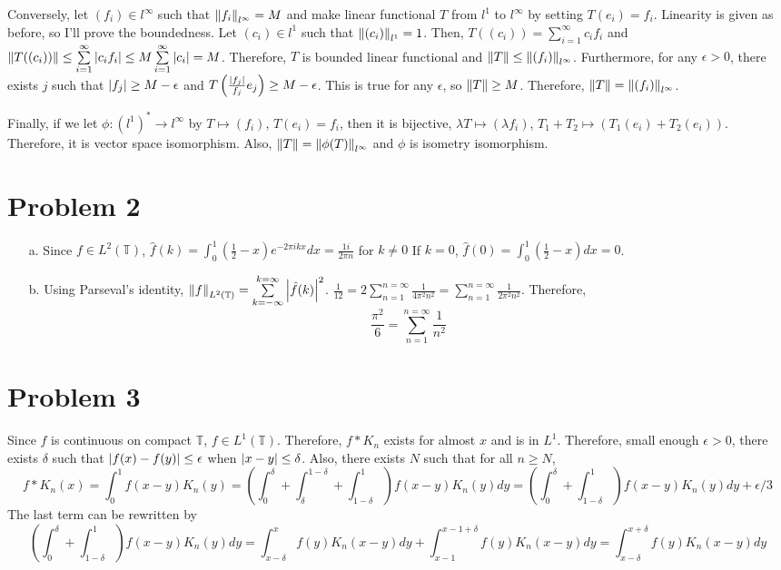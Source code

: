 \documentclass{article}
\begin{document}
Conversely, let $(f_i)\in l^\infty$ such that $\norm{f_i}_{l^\infty}=M$ and make linear functional $T$ from $l^1$ to $l^\infty$ by setting $T(e_i)=f_i$. Linearity is given as before, so I'll prove the boundedness. Let $(c_i)\in l^1$ such that $\norm{(c_i)}_{l^1}=1$. Then, $T((c_i))=\sum\limits_{i=1}^\infty c_i f_i$ and $\norm{T((c_i))}\leq \sum\limits_{i=1}^\infty \abs{c_i f_i}\leq M \sum\limits_{i=1}^\infty \abs{c_i}=M$. Therefore, $T$ is bounded linear functional and $\norm{T}\leq \norm{(f_i)}_{l^\infty}$. Furthermore, for any $\epsilon>0$, there exists $j$ such that $\abs{f_j}\geq M-\epsilon$ and $T\left(\frac{\abs{f_j}}{f_j}e_j\right)\geq M-\epsilon$. This is true for any $\epsilon$, so $\norm{T}\geq M$. Therefore, $\norm{T}=\norm{(f_i)}_{l^\infty}$.

Finally, if we let $\phi:(l^1)^*\rightarrow l^\infty$ by $T\mapsto (f_i)$, $T(e_i)=f_i$, then it is bijective, $\lambda T\mapsto (\lambda f_i)$, $T_1+T_2\mapsto (T_1(e_i)+T_2(e_i))$. Therefore, it is vector space isomorphism. Also, $\norm{T}=\norm{\phi(T)}_{l^\infty}$ and $\phi$ is isometry isomorphism.

\section*{Problem 2}
\begin{enumerate}
\item[a.] Since $f\in L^2(\mathbb{T})$, $\hat{f}(k)=\int_0^1 \left(\frac{1}{2}-x\right) e^{-2\pi ik x} dx=\frac{1 i}{2\pi n}$ for $k\neq 0$ If $k=0$, $\hat{f}(0)=\int_0^1 \left(\frac{1}{2}-x\right) dx = 0$.
\item[b.] Using Parseval's identity, $\norm{f}_{L^2(\mathbb{T})}=\sum\limits_{k=-\infty}^{k=\infty} \abs{\hat{f}(k)}^2$. $\frac{1}{12}=2\sum\limits_{n=1}^{n=\infty} \frac{1}{4\pi^2 n^2} = \sum\limits_{n=1}^{n=\infty} \frac{1}{2\pi^2 n^2}$. Therefore,
\begin{equation*}
\frac{\pi^2}{6}=\sum\limits_{n=1}^{n=\infty} \frac{1}{n^2}
\end{equation*}
\end{enumerate}
\section*{Problem 3}
Since $f$ is continuous on compact $\mathbb{T}$, $f\in L^1(\mathbb{T})$. Therefore, $f* K_n$ exists for almost $x$ and is in $L^1$. Therefore, small enough $\epsilon>0$, there exists $\delta$ such that $\abs{f(x)-f(y)}\leq \epsilon$ when $\abs{x-y}\leq \delta$. Also, there exists $N$ such that for all $n\geq N$,
\begin{equation*}
f * K_n(x)=\int_0^1 f(x-y)K_n(y) = \left(\int_0^\delta + \int_\delta^{1-\delta} + \int_{1-\delta}^1\right) f(x-y)K_n(y) dy=  \left(\int_0^\delta + \int_{1-\delta}^1\right) f(x-y)K_n(y) dy+\epsilon/3
\end{equation*}
The last term can be rewritten by
\begin{equation*}
\left(\int_0^\delta + \int_{1-\delta}^1\right) f(x-y)K_n(y) dy = \int_{x-\delta}^x f(y) K_n(x-y) dy +\int_{x-1}^{x-1+\delta} f(y) K_n(x-y)dy = \int_{x-\delta}^{x+\delta} f(y) K_n(x-y) dy
\end{equation*}
\end{document}
